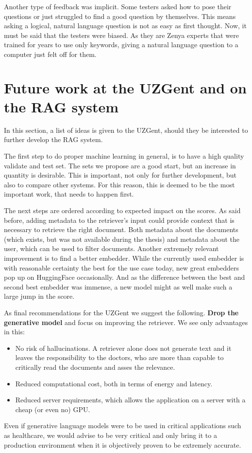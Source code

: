 Another type of feedback was implicit. Some testers asked how to pose their questions or just struggled to find a good question by themselves. This means asking a logical, natural language question is not as easy as first thought. Now, it must be said that the testers were biased. As they are Zenya experts that were trained for years to use only keywords, giving a natural language question to a computer just felt off for them.

\section{Future work at the UZGent and on the RAG system}
In this section, a list of ideas is given to the UZGent, should they be interested to further develop the RAG system.

The first step to do proper machine learning in general, is to have a high quality validate and test set. The sets we propose are a good start, but an increase in quantity is desirable. This is important, not only for further development, but also to compare other systems. For this reason, this is deemed to be the most important work, that needs to happen first. 

The next steps are ordered according to expected impact on the scores. As said before, adding metadata to the retriever's input could provide context that is necessary to retrieve the right document. Both metadata about the documents (which exists, but was not available during the thesis) and metadata about the user, which can be used to filter documents. Another extremely relevant improvement is to find a better embedder. While the currently used embedder is with reasonable certainty the best for the use case today, new great embedders pop up on HuggingFace occasionally. And as the difference between the best and second best embedder was immense, a new model might as well make such a large jump in the score.

As final recommendations for the UZGent we suggest the following. \textbf{Drop the generative model} and focus on improving the retriever. We see only advantages in this:
\begin{itemize}
    \item No risk of hallucinations. A retriever alone does not generate text and it leaves the responsibility to the doctors, who are more than capable to critically read the documents and asses the relevance.
    \item Reduced computational cost, both in terms of energy and latency.
    \item Reduced server requirements, which allows the application on a server with a cheap (or even no) GPU.
\end{itemize}
Even if generative language models were to be used in critical applications such as healthcare, we would advise to be very critical and only bring it to a production environment when it is objectively proven to be extremely accurate.

